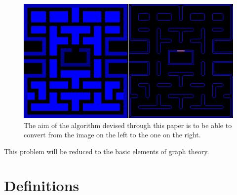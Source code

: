 \documentclass[a4paper,12pt]{article}
\begin{document}
\begin{figure}[H]
\centering
\includegraphics[width=0.8\linewidth]{Image-5.png}
\caption {The aim of the algorithm devised through this paper is to be able to convert from the image on the left to the one on the right.\autocite{myself}}\label{LevelWallConversion}
\end{figure}

This problem will be reduced to the basic elements of graph theory.

\section{Definitions}
\end{document}
